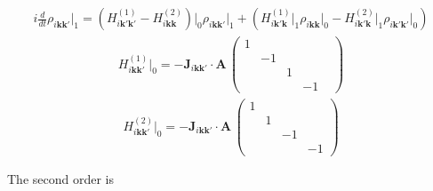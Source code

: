 \documentclass[a4paper]{article}
\begin{document}
\begin{eqnarray*}
i\frac{d}{dt} \rho_{i\mathbf{k}\mathbf{k}'}\big|_1
  =
  \left( 
    H_{i\mathbf{k}' \mathbf{k'}}^{(1)} 
    -
    H_{i\mathbf{kk}}^{(2)}
  \right)\bigg|_0
    \rho_{i\mathbf{kk'}}\big|_1
  +
  \left(
    H_{i\mathbf{k}' \mathbf{k}}^{(1)}\big|_1 \rho_{i\mathbf{kk}}\big|_0 
    -
    H_{i\mathbf{k'k}}^{(2)}\big|_1
    \rho_{i\mathbf{k'k'}}\big|_0
  \right)
\end{eqnarray*}
\begin{eqnarray*}
  H_{i\mathbf{kk'}}^{(1)}\big|_0
  =
  -\mathbf{J}_{i\mathbf{kk'}} \cdot \mathbf{A} \,
  \begin{pmatrix}
    1 &  & & \\
     & -1 & & \\
    && 1 &  \\
    &&  & -1& 
  \end{pmatrix}
\end{eqnarray*}
\begin{eqnarray*}
  H_{i\mathbf{kk'}}^{(2)}\big|_0
  =
  -\mathbf{J}_{i\mathbf{kk'}} \cdot \mathbf{A} \,
  \begin{pmatrix}
    1 &&  & \\
    & 1 &&  \\
     && -1 & \\
    &  &&-1 
  \end{pmatrix}
\end{eqnarray*}

The second order is
\end{document}
